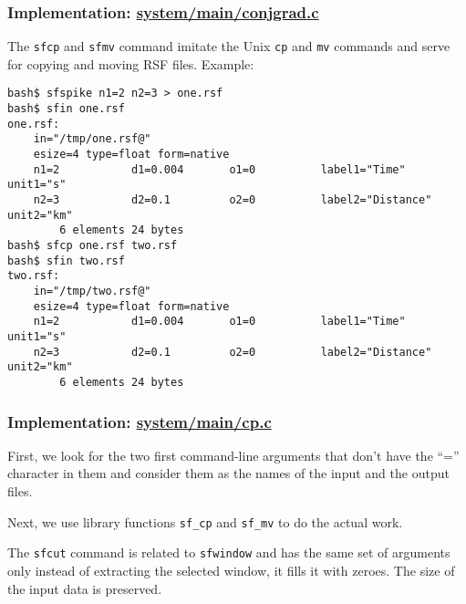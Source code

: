 \subsubsection{Implementation: \href{http://rsf.svn.sourceforge.net/viewvc/rsf/trunk/system/main/conjgrad.c?view=markup}{system/main/conjgrad.c}}


\noindent\doublebox{\parbox{\textwidth}{

}}

The \texttt{sfcp} and \texttt{sfmv} command imitate the Unix
\texttt{cp} and \texttt{mv} commands and serve for copying and moving
RSF files. Example:
\begin{verbatim}
bash$ sfspike n1=2 n2=3 > one.rsf
bash$ sfin one.rsf
one.rsf:
    in="/tmp/one.rsf@"
    esize=4 type=float form=native
    n1=2           d1=0.004       o1=0          label1="Time" unit1="s"
    n2=3           d2=0.1         o2=0          label2="Distance" unit2="km"
        6 elements 24 bytes
bash$ sfcp one.rsf two.rsf
bash$ sfin two.rsf
two.rsf:
    in="/tmp/two.rsf@"
    esize=4 type=float form=native
    n1=2           d1=0.004       o1=0          label1="Time" unit1="s"
    n2=3           d2=0.1         o2=0          label2="Distance" unit2="km"
        6 elements 24 bytes
\end{verbatim}

\subsubsection{Implementation: \href{http://rsf.svn.sourceforge.net/viewvc/rsf/trunk/system/main/cp.c?view=markup}{system/main/cp.c}}

First, we look for the two first command-line arguments that don't
have the ``='' character in them and consider them as the names of the
input and the output files.  

Next, we use library functions \verb#sf_cp# and \verb#sf_mv# to do the actual work.

\noindent\doublebox{\parbox{\textwidth}{

}}

The \texttt{sfcut} command is related to \texttt{sfwindow} and has the same
set of arguments only instead of extracting the selected window, it fills it
with zeroes. The size of the input data is preserved. 

